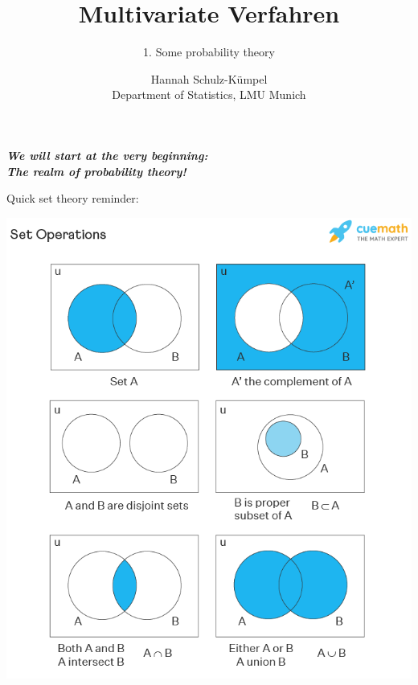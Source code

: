 \documentclass[a4,11pt]{beamer}
\begin{document}
	\title{Multivariate Verfahren}
	\subtitle{1. Some probability theory}
	
	
	\author[Hannah Schulz-Kümpel]{Hannah Schulz-Kümpel\bigskip\\
 Department of Statistics, LMU Munich}
	\date{}
	
	
	\frame[plain]{
		\maketitle}


\begin{frame}{}
    \begin{center}
        \textcolor{blueberry}{\bfseries \emph{We will start at the very beginning: \\
The realm of probability theory!}}
    \end{center}
    \tableofcontents
\end{frame}
\begin{frame}{}\begin{minipage}{.35\linewidth}
     Quick set theory reminder: 
\end{minipage}%
\begin{minipage}{.65\linewidth}
    \vspace{-1.2cm}
  \includegraphics[height=\paperheight]{graphics/SetOperationsold.png}
\end{minipage}
\end{frame}
\end{document}
